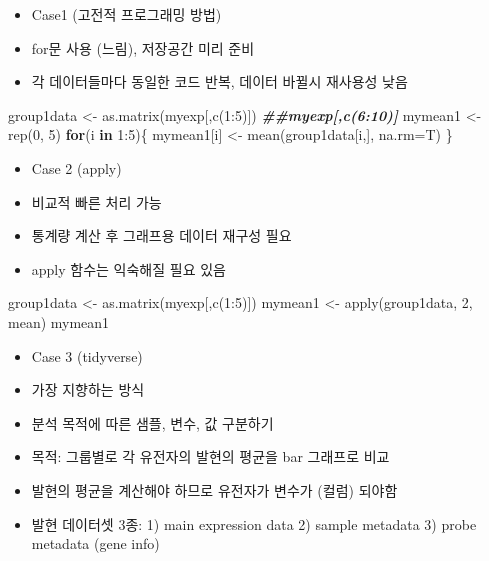 \documentclass[
]{book}
\newenvironment{Shaded}{\begin{snugshade}}{\end{snugshade}}
\newcommand{\AttributeTok}[1]{\textcolor[rgb]{0.77,0.63,0.00}{#1}}
\newcommand{\ControlFlowTok}[1]{\textcolor[rgb]{0.13,0.29,0.53}{\textbf{#1}}}
\newcommand{\DecValTok}[1]{\textcolor[rgb]{0.00,0.00,0.81}{#1}}
\newcommand{\DocumentationTok}[1]{\textcolor[rgb]{0.56,0.35,0.01}{\textbf{\textit{#1}}}}
\newcommand{\FunctionTok}[1]{\textcolor[rgb]{0.00,0.00,0.00}{#1}}
\newcommand{\NormalTok}[1]{#1}
\newcommand{\OtherTok}[1]{\textcolor[rgb]{0.56,0.35,0.01}{#1}}
\newcommand{\SpecialCharTok}[1]{\textcolor[rgb]{0.00,0.00,0.00}{#1}}
\providecommand{\tightlist}{%
  \setlength{\itemsep}{0pt}\setlength{\parskip}{0pt}}
\begin{document}
\begin{itemize}
\tightlist
\item
  Case1 (고전적 프로그래밍 방법)
\item
  for문 사용 (느림), 저장공간 미리 준비
\item
  각 데이터들마다 동일한 코드 반복, 데이터 바뀔시 재사용성 낮음
\end{itemize}

\begin{Shaded}
\begin{Highlighting}[]
\NormalTok{group1data }\OtherTok{\textless{}{-}} \FunctionTok{as.matrix}\NormalTok{(myexp[,}\FunctionTok{c}\NormalTok{(}\DecValTok{1}\SpecialCharTok{:}\DecValTok{5}\NormalTok{)])}
\DocumentationTok{\#\#myexp[,c(6:10)]}
\NormalTok{mymean1 }\OtherTok{\textless{}{-}} \FunctionTok{rep}\NormalTok{(}\DecValTok{0}\NormalTok{, }\DecValTok{5}\NormalTok{)}
\ControlFlowTok{for}\NormalTok{(i }\ControlFlowTok{in} \DecValTok{1}\SpecialCharTok{:}\DecValTok{5}\NormalTok{)\{}
\NormalTok{  mymean1[i] }\OtherTok{\textless{}{-}} \FunctionTok{mean}\NormalTok{(group1data[i,], }\AttributeTok{na.rm=}\NormalTok{T)}
\NormalTok{\}}
\end{Highlighting}
\end{Shaded}

\begin{itemize}
\tightlist
\item
  Case 2 (apply)
\item
  비교적 빠른 처리 가능
\item
  통계량 계산 후 그래프용 데이터 재구성 필요
\item
  apply 함수는 익숙해질 필요 있음
\end{itemize}

\begin{Shaded}
\begin{Highlighting}[]
\NormalTok{group1data }\OtherTok{\textless{}{-}} \FunctionTok{as.matrix}\NormalTok{(myexp[,}\FunctionTok{c}\NormalTok{(}\DecValTok{1}\SpecialCharTok{:}\DecValTok{5}\NormalTok{)])}
\NormalTok{mymean1 }\OtherTok{\textless{}{-}} \FunctionTok{apply}\NormalTok{(group1data, }\DecValTok{2}\NormalTok{, mean)}
\NormalTok{mymean1}
\end{Highlighting}
\end{Shaded}

\begin{itemize}
\tightlist
\item
  Case 3 (tidyverse)
\item
  가장 지향하는 방식
\item
  분석 목적에 따른 샘플, 변수, 값 구분하기
\item
  목적: 그룹별로 각 유전자의 발현의 평균을 bar 그래프로 비교
\item
  발현의 평균을 계산해야 하므로 유전자가 변수가 (컬럼) 되야함
\item
  발현 데이터셋 3종: 1) main expression data 2) sample metadata 3) probe metadata (gene info)
\end{itemize}
\end{document}
